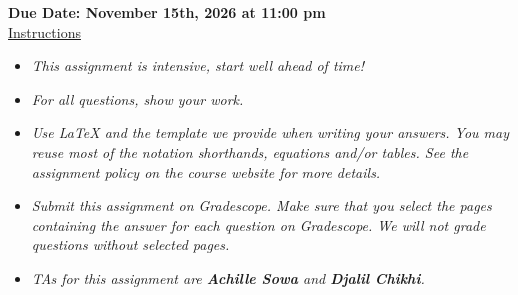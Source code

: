 \documentclass[12pt]{article}
\theoremstyle{definition}
\begin{document}
\fancyhead{}
\fancyfoot{}


\vspace{1cm}

\shorthandoff{:}
{\textbf{Due Date: November 15th, 2026 at 11:00 pm}}\\


\vspace{-0.5cm}
\underline{Instructions}%
\renewcommand{\labelitemi}{\textbullet}

\renewcommand{\labelitemi}{\textbullet}

\begin{itemize}
\item \emph{This assignment is intensive, start well ahead of time!}
\item \emph{For all questions, show your work.}
\item \emph{Use LaTeX and the template we provide when writing your answers.
You may reuse most of the notation shorthands, equations and/or tables.
See the assignment policy on the course website for more details.}
\item \emph{Submit this assignment on Gradescope. Make sure that you select the pages containing the answer for each question on Gradescope. We will not grade questions without selected pages.}
\item \emph{TAs for this assignment are \textbf{Achille Sowa} and \textbf{Djalil Chikhi}.}
\end{itemize}
\vspace{0.2cm}


\vspace{0.2cm}
\end{document}
